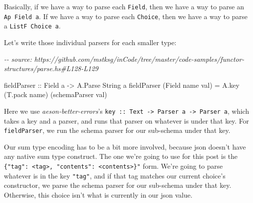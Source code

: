 \documentclass[]{article}
\newenvironment{Shaded}{}{}
\newcommand{\CommentTok}[1]{\textcolor[rgb]{0.38,0.63,0.69}{\textit{#1}}}
\newcommand{\DataTypeTok}[1]{\textcolor[rgb]{0.56,0.13,0.00}{#1}}
\newcommand{\KeywordTok}[1]{\textcolor[rgb]{0.00,0.44,0.13}{\textbf{#1}}}
\newcommand{\NormalTok}[1]{#1}
\newcommand{\OperatorTok}[1]{\textcolor[rgb]{0.40,0.40,0.40}{#1}}
\newcommand{\OtherTok}[1]{\textcolor[rgb]{0.00,0.44,0.13}{#1}}
\newcommand{\StringTok}[1]{\textcolor[rgb]{0.25,0.44,0.63}{#1}}
\begin{document}
Basically, if we have a way to parse each \texttt{Field}, then we have a way to
parse an \texttt{Ap\ Field\ a}. If we have a way to parse each \texttt{Choice},
then we have a way to parse a \texttt{ListF\ Choice\ a}.

Let's write those individual parsers for each smaller type:

\begin{Shaded}
\begin{Highlighting}[]
\CommentTok{{-}{-} source: https://github.com/mstksg/inCode/tree/master/code{-}samples/functor{-}structures/parse.hs\#L128{-}L129}

\OtherTok{fieldParser ::} \DataTypeTok{Field}\NormalTok{ a }\OtherTok{{-}\textgreater{}} \DataTypeTok{A.Parse} \DataTypeTok{String}\NormalTok{ a}
\NormalTok{fieldParser (}\DataTypeTok{Field}\NormalTok{ name val) }\OtherTok{=}\NormalTok{ A.key (T.pack name) (schemaParser val)}
\end{Highlighting}
\end{Shaded}

Here we use \emph{aeson-better-errors}'s
\texttt{key\ ::\ Text\ -\textgreater{}\ Parser\ a\ -\textgreater{}\ Parser\ a},
which takes a key and a parser, and runs that parser on whatever is under that
key. For \texttt{fieldParser}, we run the schema parser for our sub-schema under
that key.

\begin{Shaded}
\end{Shaded}

Our sum type encoding has to be a bit more involved, because json doesn't have
any native sum type construct. The one we're going to use for this post is the
\texttt{\{"tag":\ \textless{}tag\textgreater{},\ "contents":\ \textless{}contents\textgreater{}\}"}
form. We're going to parse whatever is in the key \texttt{"tag"}, and if that
tag matches our current choice's constructor, we parse the schema parser for our
sub-schema under that key. Otherwise, this choice isn't what is currently in our
json value.
\end{document}
